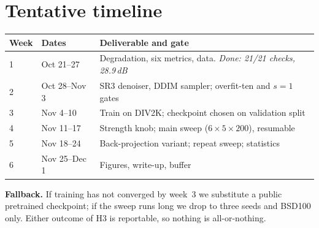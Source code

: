 \documentclass{article}
\begin{document}
\section{Tentative timeline}

\begin{table}[h]
\centering
\scriptsize
\setlength{\tabcolsep}{5pt}
\begin{tabular}{@{}lll@{}}
\toprule
Week & Dates & Deliverable and gate \\
\midrule
1 & Oct 21--27 & Degradation, six metrics, data. \emph{Done: 21/21 checks, 28.9\,dB} \\
2 & Oct 28--Nov 3 & SR3 denoiser, DDIM sampler; overfit-ten and $s{=}1$ gates \\
3 & Nov 4--10 & Train on DIV2K; checkpoint chosen on validation split \\
4 & Nov 11--17 & Strength knob; main sweep ($6{\times}5{\times}200$), resumable \\
5 & Nov 18--24 & Back-projection variant; repeat sweep; statistics \\
6 & Nov 25--Dec 1 & Figures, write-up, buffer \\
\bottomrule
\end{tabular}
\end{table}

\textbf{Fallback.} If training has not converged by week~3 we substitute a
public pretrained checkpoint; if the sweep runs long we drop to three seeds and
BSD100 only. Either outcome of H3 is reportable, so nothing is all-or-nothing.



\end{document}
